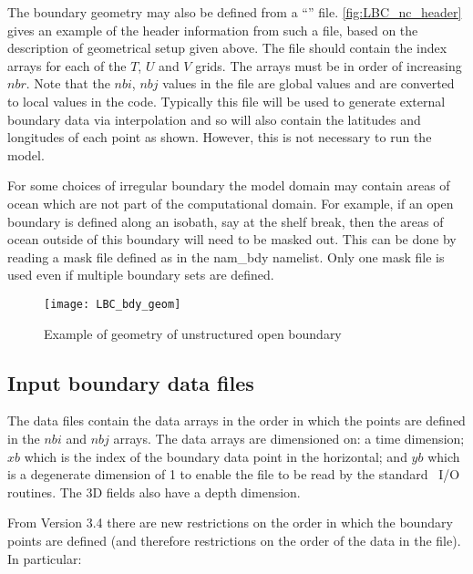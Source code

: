 \documentclass[../main/NEMO_manual]{subfiles}
\begin{document}
The boundary geometry may also be defined from a ``'' file.
\autoref{fig:LBC_nc_header} gives an example of the header information from such a file, based on the description of geometrical setup given above.
The file should contain the index arrays for each of the $T$, $U$ and $V$ grids.
The arrays must be in order of increasing $nbr$.
Note that the $nbi$, $nbj$ values in the file are global values and are converted to local values in the code.
Typically this file will be used to generate external boundary data via interpolation and so
will also contain the latitudes and longitudes of each point as shown.
However, this is not necessary to run the model.

For some choices of irregular boundary the model domain may contain areas of ocean which
are not part of the computational domain.
For example, if an open boundary is defined along an isobath, say at the shelf break,
then the areas of ocean outside of this boundary will need to be masked out.
This can be done by reading a mask file defined as  in the nam\_bdy namelist.
Only one mask file is used even if multiple boundary sets are defined.

\begin{figure}[!t]
  \centering
  \texttt{[image: LBC\_bdy\_geom]}
  \caption[Geometry of unstructured open boundary]{Example of geometry of unstructured open boundary}
  \label{fig:LBC_bdy_geom}
\end{figure}

\subsection{Input boundary data files}
\label{subsec:LBC_bdy_data}

The data files contain the data arrays in the order in which the points are defined in the $nbi$ and $nbj$ arrays.
The data arrays are dimensioned on:
a time dimension;
$xb$ which is the index of the boundary data point in the horizontal;
and $yb$ which is a degenerate dimension of 1 to enable the file to be read by the standard \NEMO\ I/O routines.
The 3D fields also have a depth dimension.

From Version 3.4 there are new restrictions on the order in which the boundary points are defined
(and therefore restrictions on the order of the data in the file).
In particular:
\end{document}
